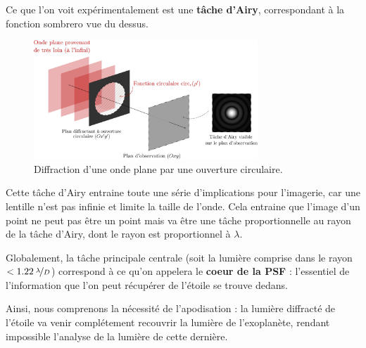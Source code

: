 Ce que l'on voit expérimentalement est une \textbf{tâche d'Airy}, correspondant à la fonction sombrero vue du dessus.

\begin{figure}[htbp]
    \centering
    \includegraphics[width=0.75\textwidth]{figures/diff_expl.png}
    \caption{Diffraction d'une onde plane par une ouverture circulaire.}
    \label{fig:diff_expl}
\end{figure}




Cette tâche d’Airy entraine toute une série d’implications pour l’imagerie, car une lentille n’est pas
infinie et limite la taille de l’onde. Cela entraine que l’image d’un point ne peut pas être un point mais
va être une tâche proportionnelle au rayon de la tâche d’Airy, dont le rayon est proportionnel à $\lambda$. %

Globalement, la tâche principale centrale (soit la lumière comprise dans le rayon $< 1.22\: \nicefrac{\lambda}{D}$) correspond à ce qu'on appelera le \textbf{coeur de la PSF} : l'essentiel de l'information que l'on peut récupérer de l'étoile se trouve dedans.

Ainsi, nous comprenons la nécessité de l'apodisation : la lumière diffracté de l'étoile va venir complétement recouvrir la lumière de l'exoplanète, rendant impossible l'analyse de la lumière de cette dernière. 

